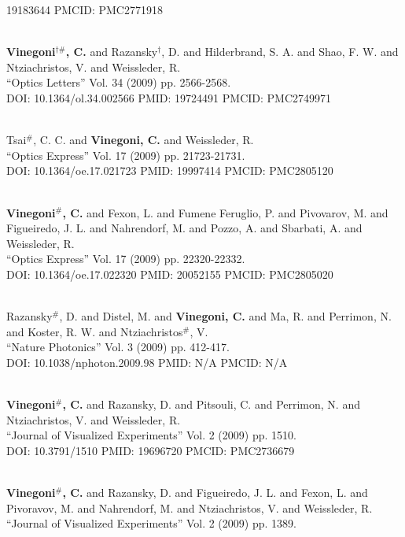 19183644 PMCID: PMC2771918\item {} \\ {\bf Vinegoni$^{\dag \#}$, C.} and Razansky$^\dag$, D. and Hilderbrand, S. A. and Shao, F. W. and Ntziachristos, V. and Weissleder, R. \\ ``Optics Letters'' Vol. 34 (2009) pp. 2566-2568. \\ DOI: 10.1364/ol.34.002566 PMID: 19724491 PMCID: PMC2749971\item {} \\ Tsai$^\#$, C. C. and {\bf Vinegoni, C.} and Weissleder, R. \\ ``Optics Express'' Vol. 17 (2009) pp. 21723-21731. \\ DOI: 10.1364/oe.17.021723 PMID: 19997414 PMCID: PMC2805120\item {} \\ {\bf Vinegoni$^\#$, C.} and Fexon, L. and Fumene Feruglio, P. and Pivovarov, M. and Figueiredo, J. L. and Nahrendorf, M. and Pozzo, A. and Sbarbati, A. and Weissleder, R. \\ ``Optics Express'' Vol. 17 (2009) pp. 22320-22332. \\ DOI: 10.1364/oe.17.022320 PMID: 20052155 PMCID: PMC2805020\item {} \\ Razansky$^\#$, D. and Distel, M. and {\bf Vinegoni, C.} and Ma, R. and Perrimon, N. and Koster, R. W. and Ntziachristos$^\#$, V. \\ ``Nature Photonics'' Vol. 3 (2009) pp. 412-417. \\ DOI: 10.1038/nphoton.2009.98 PMID: N/A PMCID: N/A\item {} \\ {\bf Vinegoni$^\#$, C.} and Razansky, D. and Pitsouli, C. and Perrimon, N. and Ntziachristos, V. and Weissleder, R. \\ ``Journal of Visualized Experiments'' Vol. 2 (2009) pp. 1510. \\ DOI: 10.3791/1510 PMID: 19696720 PMCID: PMC2736679\item {} \\ {\bf Vinegoni$^\#$, C.} and Razansky, D. and Figueiredo, J. L. and Fexon, L. and Pivoravov, M. and Nahrendorf, M. and Ntziachristos, V. and Weissleder, R. \\ ``Journal of Visualized Experiments'' Vol. 2 (2009) pp. 1389. \\ 
